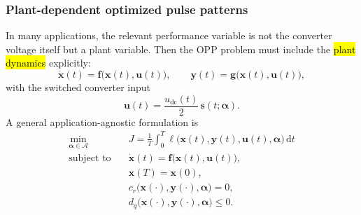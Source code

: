 \begin{frame}
    \frametitle{Plant-dependent optimized pulse patterns}
    In many applications, the relevant performance variable is not the converter voltage itself but a plant variable. \pause Then the OPP problem must include the \hl{plant dynamics} explicitly:
    \begin{equation}
        \dot{\bm{x}}(t)=\bm{f}\bigl(\bm{x}(t),\bm{u}(t)\bigr),
        \qquad
        \bm{y}(t)=\bm{g}\bigl(\bm{x}(t),\bm{u}(t)\bigr),
    \end{equation}
    with the switched converter input
    \begin{equation}
        \bm{u}(t)=\frac{u_\mathrm{dc}(t)}{2}\,\bm{s}(t;\bm{\alpha}).
    \end{equation}\pause
    A general application-agnostic formulation is
    \begin{equation}
        \begin{aligned}
            \min_{\bm{\alpha}\in\mathcal{A}} \quad &
            J=
            \frac{1}{T}
            \int_{0}^{T}
            \ell\bigl(\bm{x}(t),\bm{y}(t),\bm{u}(t),\bm{\alpha}\bigr)\,\mathrm{d}t \\
            \text{subject to} \quad                &
            \dot{\bm{x}}(t)=\bm{f}\bigl(\bm{x}(t),\bm{u}(t)\bigr),                 \\
                                                   &
            \bm{x}(T)=\bm{x}(0),                                                   \\
                                                   &
            c_r\bigl(\bm{x}(\cdot),\bm{y}(\cdot),\bm{\alpha}\bigr)=0,              \\
                                                   &
            d_q\bigl(\bm{x}(\cdot),\bm{y}(\cdot),\bm{\alpha}\bigr)\leq 0.
        \end{aligned}
        \label{eq:general_plant_dependent_opp_rev3}
    \end{equation}
\end{frame}

